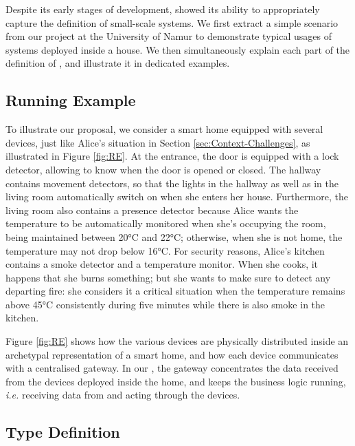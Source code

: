 Despite its early stages of development, \IOTDSL showed its ability to appropriately capture the definition of small-scale \IOT systems. We first extract a simple scenario from our project at the University of Namur to demonstrate typical usages of \IOT systems deployed inside a house. We then simultaneously explain each part of the definition of \IOTDSL, and illustrate it in dedicated examples.

\subsection{Running Example}
\label{sec:IoTDSL-Example}

To illustrate our proposal, we consider a smart home equipped with several devices, just like Alice's situation in Section \ref{sec:Context-Challenges}, as illustrated in Figure \ref{fig:RE}. At the entrance, the door is equipped with a lock detector, allowing to know when the door is opened or closed. The hallway contains movement detectors, so that the lights in the hallway as well as in the living room automatically switch on when she enters her house. Furthermore, the living room also contains a presence detector because Alice wants the temperature to be automatically monitored when she's occupying the room, being maintained between 20°C and 22°C; otherwise, when she is not home, the temperature may not drop below 16°C. For security reasons, Alice's kitchen contains a smoke detector and a temperature monitor. When she cooks, it happens that she burns something; but she wants to make sure to detect any departing fire: she considers it a critical situation when the temperature remains above 45°C consistently during five minutes while there is also smoke in the kitchen. 

Figure \ref{fig:RE} shows how the various devices are physically distributed inside an archetypal representation of a smart home, and how each device communicates with a centralised gateway. In our \DSL, the gateway concentrates the data received from the devices deployed inside the home, and keeps the business logic running, \textit{i.e.} receiving data from and acting through the devices. 

\subsection{Type Definition}
\label{sec:IoTDSL-Type}
 
